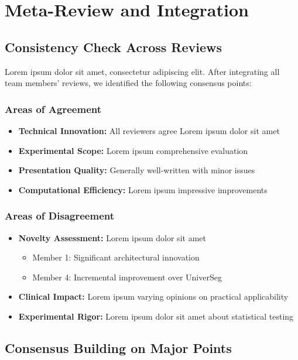 \section*{Meta-Review and Integration}
\label{sec:meta_review}

\subsection{Consistency Check Across Reviews}
Lorem ipsum dolor sit amet, consectetur adipiscing elit. After integrating all team members' reviews, we identified the following consensus points:

\subsubsection{Areas of Agreement}
\begin{itemize}
    \item \textbf{Technical Innovation:} All reviewers agree Lorem ipsum dolor sit amet
    \item \textbf{Experimental Scope:} Lorem ipsum comprehensive evaluation
    \item \textbf{Presentation Quality:} Generally well-written with minor issues
    \item \textbf{Computational Efficiency:} Lorem ipsum impressive improvements
\end{itemize}

\subsubsection{Areas of Disagreement}
\begin{itemize}
    \item \textbf{Novelty Assessment:} Lorem ipsum dolor sit amet
    \begin{itemize}
        \item Member 1: Significant architectural innovation
        \item Member 4: Incremental improvement over UniverSeg
    \end{itemize}
    \item \textbf{Clinical Impact:} Lorem ipsum varying opinions on practical applicability
    \item \textbf{Experimental Rigor:} Lorem ipsum dolor sit amet about statistical testing
\end{itemize}

\subsection{Consensus Building on Major Points}
